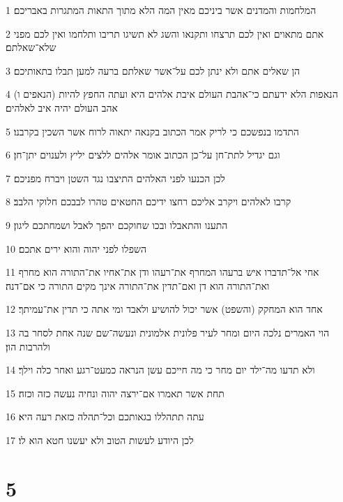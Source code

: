 \par 1 המלחמות והמדנים אשר ביניכם מאין המה הלא מתוך התאות המתגרות באבריכם׃
\par 2 אתם מתאוים ואין לכם תרצחו ותקנאו והשג לא תשיגו תריבו ותלחמו ואין לכם מפני שלא־שאלתם׃
\par 3 הן שאלים אתם ולא ינתן לכם על־אשר שאלתם ברעה למען תבלו בתאותיכם׃
\par 4 (הנאפים ו) הנאפות הלא ידעתם כי־אהבת העולם איבת אלהים היא ועתה החפץ להיות אהב העולם יהיה איב לאלהים׃
\par 5 התדמו בנפשכם כי לריק אמר הכתוב בקנאה יתאוה לרוח אשר השכין בקרבנו׃
\par 6 וגם יגדיל לתת־חן על־כן הכתוב אומר אלהים ללצים יליץ ולענוים יתן־חן׃
\par 7 לכן הכנעו לפני האלהים התיצבו נגד השטן ויברח מפניכם׃
\par 8 קרבו לאלהים ויקרב אליכם רחצו ידיכם החטאים טהרו לבבכם חלוקי הלבב׃
\par 9 התענו והתאבלו ובכו שחוקכם יהפך לאבל ושמחתכם ליגון׃
\par 10 השפלו לפני יהוה והוא ירים אתכם׃
\par 11 אחי אל־תדברו איש ברעהו המחרף את־רעהו ודן את־אחיו את־התורה הוא מחרף ואת־התורה הוא דן ואם־תדין את־התורה אינך מקים התורה כי אם־דנה׃
\par 12 אחד הוא המחקק (והשפט) אשר יכול להושיע ולאבד ומי אתה כי תדין את־עמיתך׃
\par 13 הוי האמרים נלכה היום ומחר לעיר פלונית אלמונית ונעשה־שם שנה אחת לסחר בה ולהרבות הון׃
\par 14 ולא תדעו מה־ילד יום מחר כי מה חייכם עשן הנראה כמעט־רגע ואחר כלה וילך׃
\par 15 תחת אשר תאמרו אם־ירצה יהוה ונחיה נעשה כזה וכזה׃
\par 16 עתה תתהללו בגאותכם וכל־תהלה כזאת רעה היא׃
\par 17 לכן היודע לעשות הטוב ולא יעשנו חטא הוא לו׃

\chapter{5}


